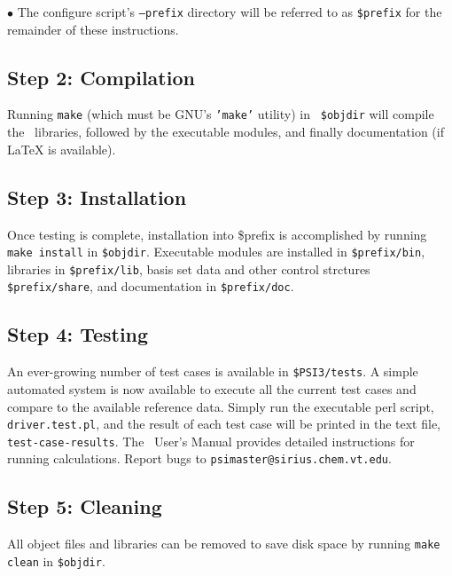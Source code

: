 \documentclass[12pt]{article}
\begin{document}
$\bullet$ The configure script's {\tt --prefix} directory will be referred
to as {\tt \$prefix} for the remainder of these instructions.

\subsection{Step 2: Compilation}

Running {\tt make} (which must be GNU's {\tt 'make'} utility) in {\tt
\$objdir} will compile the \PSIthree\ libraries, followed by the executable
modules, and finally documentation (if LaTeX is available).

\subsection{Step 3: Installation}

Once testing is complete, installation into \$prefix is accomplished by
running {\tt make install} in {\tt \$objdir}.   Executable modules are
installed in {\tt \$prefix/bin}, libraries in {\tt \$prefix/lib}, basis set
data and other control strctures {\tt \$prefix/share}, and documentation
in {\tt \$prefix/doc}.

\subsection{Step 4: Testing}

An ever-growing number of test cases is available in {\tt \$PSI3/tests}.
A simple automated system is now available to execute all the current test
cases and compare to the available reference data. Simply run the   
executable perl script, {\tt driver.test.pl}, and the result of each test case
will be printed in the text file, {\tt test-case-results}. The \PSIthree\ 
User's Manual provides detailed instructions for running calculations.
Report bugs to {\tt psimaster@sirius.chem.vt.edu}.

\subsection{Step 5: Cleaning}

All object files and libraries can be removed to save disk space by running
{\tt make clean} in {\tt \$objdir}.
\end{document}
